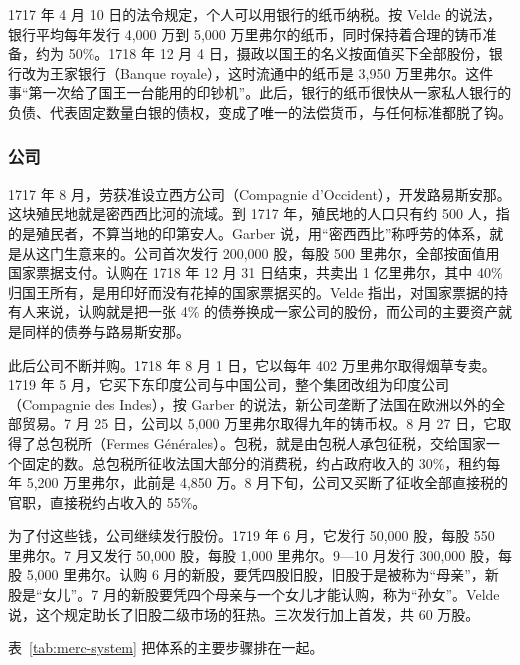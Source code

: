 1717 年 4 月 10 日的法令规定，个人可以用银行的纸币纳税\cite{velde2003}。按 Velde 的说法，银行平均每年发行 4,000 万到 5,000 万里弗尔的纸币，同时保持着合理的铸币准备，约为 50\%。1718 年 12 月 4 日，摄政以国王的名义按面值买下全部股份，银行改为王家银行（Banque royale），这时流通中的纸币是 3,950 万里弗尔。这件事“第一次给了国王一台能用的印钞机”。此后，银行的纸币很快从一家私人银行的负债、代表固定数量白银的债权，变成了唯一的法偿货币，与任何标准都脱了钩\cite{velde2003}。

\subsubsection{公司}
1717 年 8 月，劳获准设立西方公司（Compagnie d'Occident），开发路易斯安那\cite{velde2003}。这块殖民地就是密西西比河的流域。到 1717 年，殖民地的人口只有约 500 人，指的是殖民者，不算当地的印第安人\cite{velde2003}。Garber 说，用“密西西比”称呼劳的体系，就是从这门生意来的\cite{garber1990}。公司首次发行 200,000 股，每股 500 里弗尔，全部按面值用国家票据支付。认购在 1718 年 12 月 31 日结束，共卖出 1 亿里弗尔，其中 40\% 归国王所有，是用印好而没有花掉的国家票据买的\cite{velde2003}。Velde 指出，对国家票据的持有人来说，认购就是把一张 4\% 的债券换成一家公司的股份，而公司的主要资产就是同样的债券与路易斯安那\cite{velde2003}。

此后公司不断并购。1718 年 8 月 1 日，它以每年 402 万里弗尔取得烟草专卖。1719 年 5 月，它买下东印度公司与中国公司，整个集团改组为印度公司（Compagnie des Indes），按 Garber 的说法，新公司垄断了法国在欧洲以外的全部贸易\cite{garber1990}。7 月 25 日，公司以 5,000 万里弗尔取得九年的铸币权。8 月 27 日，它取得了总包税所（Fermes Générales）。包税，就是由包税人承包征税，交给国家一个固定的数。总包税所征收法国大部分的消费税，约占政府收入的 30\%，租约每年 5,200 万里弗尔，此前是 4,850 万。8 月下旬，公司又买断了征收全部直接税的官职，直接税约占收入的 55\%\cite{velde2003}。

为了付这些钱，公司继续发行股份。1719 年 6 月，它发行 50,000 股，每股 550 里弗尔。7 月又发行 50,000 股，每股 1,000 里弗尔。9—10 月发行 300,000 股，每股 5,000 里弗尔\cite{velde2003}。认购 6 月的新股，要凭四股旧股，旧股于是被称为“母亲”，新股是“女儿”。7 月的新股要凭四个母亲与一个女儿才能认购，称为“孙女”。Velde 说，这个规定助长了旧股二级市场的狂热\cite{velde2003}。三次发行加上首发，共 60 万股。

表~\ref{tab:merc-system} 把体系的主要步骤排在一起。

